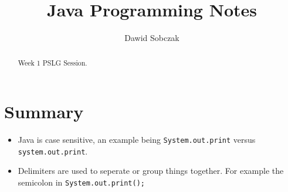 \documentclass[a4paper,10pt]{article}
\title{Java Programming Notes}
\author{Dawid Sobczak}
\date{}
\begin{document}
    \maketitle
    \begin{abstract}
        Week 1 PSLG Session.
    \end{abstract}
        \section{Summary}
        \begin{itemize}
         \item Java is case sensitive, an example being \lstinline{System.out.print} versus
\lstinline{system.out.print}.
         \item Delimiters are used to seperate or group things together. For example the
semicolon in \lstinline{System.out.print();}
        \end{itemize}
\end{document}
